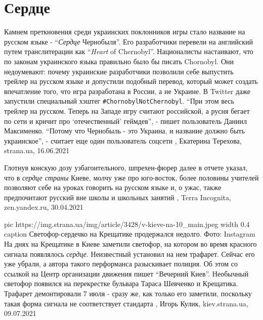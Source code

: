  
 
 
 
 
\chapter{Сердце}
\label{sec:slova.serdce}

Камнем преткновения среди украинских поклонников игры стало название на русском
языке - \enquote{\emph{Сердце} Чернобыля}. Его разработчики перевели на
английский путем транслитерации как \enquote{\emph{Heart} of Chernobyl}.
Националисты настаивают, что по законам украинского языка правильно было бы
писать Chornobyl. Они недоумевают: почему украинские разработчики позволили
себе выпустить трейлер на русском языке и допустили подобный перевод, который
может создать впечатление того, что игра разработана в России, а не Украине.  В
Twitter даже запустили специальный хэштег \verb|#ChornobylNotChernobyl|.
\enquote{При этом весь трейлер на русском. Теперь на Западе игру считают
российской, а русня бегает по сети и кричит про \enquote{отечественный}
геймдев}, - пишет пользователь Даниил Максименко.  \enquote{Потому что
Чернобыль - это Украина, и название должно быть украинское}, - считает еще один
пользователь соцсети
, 
Екатерина Терехова, strana.ua, 16.06.2021

Глотнув конскую дозу узбагоительного, шпрехен-фюрер далее в отчете указал, что
в \emph{сердце страны} Киеве, молчу уже про юго-восток, более половины учителей
позволяют себе на уроках говорить на русском языке и, о ужас, также
предпочитают русский вне школы и школьных занятий
, 
Terra Incognita, zen.yandex.ru, 30.04.2021

\ifcmt
  pic https://img.strana.ua/img/article/3428/v-kieve-na-10_main.jpeg
	width 0.4
	caption Светофор-сердечко на Крещатике продержался недолго. Фото: Instagram
\fi
На днях на Крещатике в Киеве заметили светофор, на котором во время красного
сигнала появлялось \emph{сердце}. Неизвестный установил на нем трафарет. Сейчас
его уже убрали, а автора такого перформанса разыскивает полиция.  Об этом со
ссылкой на Центр организации движения пишет \enquote{Вечерний Киев}.  Необычный
светофор появился на перекрестке бульвара Тараса Шевченко и Крещатика. Трафарет
демонтировали 7 июля - сразу же, как только его заметили, поскольку такая форма
сигнала не соответствует стандарта
, 
Игорь Кулик, kiev.strana.ua, 09.07.2021


